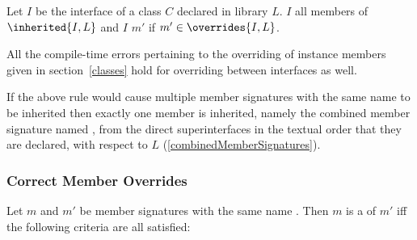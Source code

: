\documentclass[makeidx]{article}
\begin{document}
\LMHash{}%
Let $I$ be the interface of a class $C$ declared in library $L$.
$I$  all members of $\inherited{I, L}$
and $I$  $m'$ if $m' \in \overrides{I, L}$.

\LMHash{}%
All the compile-time errors pertaining to the overriding of instance members
given in section~\ref{classes} hold for overriding between interfaces as well.

\LMHash{}%
If the above rule would cause multiple member signatures
with the same name \id{} to be inherited then
exactly one member is inherited, namely
the combined member signature named \id{},
from the direct superinterfaces
in the textual order that they are declared,
with respect to $L$
(\ref{combinedMemberSignatures}).


\subsubsection{Correct Member Overrides}

\LMHash{}%
Let $m$ and $m'$ be member signatures with the same name \id.
Then $m$ is a  of $m'$
if{}f the following criteria are all satisfied:
\end{document}
